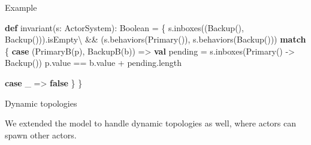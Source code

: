 \documentclass[ignorenonframetext,]{beamer}
\newenvironment{Shaded}{}{}
\newcommand{\FunctionTok}[1]{\textcolor[rgb]{0.02,0.16,0.49}{#1}}
\newcommand{\KeywordTok}[1]{\textcolor[rgb]{0.00,0.44,0.13}{\textbf{#1}}}
\newcommand{\NormalTok}[1]{#1}
\begin{document}
\begin{frame}[fragile]{%
\protect\hypertarget{example-4}{%
Example}}

\begin{Shaded}
\begin{Highlighting}[]
\KeywordTok{def} \FunctionTok{invariant}\NormalTok{(s: ActorSystem): Boolean = \{}
\NormalTok{  s.}\FunctionTok{inboxes}\NormalTok{((}\FunctionTok{Backup}\NormalTok{(), }\FunctionTok{Backup}\NormalTok{())).}\FunctionTok{isEmpty}\NormalTok{\textbackslash{}}
\NormalTok{  &&}
\NormalTok{  (s.}\FunctionTok{behaviors}\NormalTok{(}\FunctionTok{Primary}\NormalTok{()), s.}\FunctionTok{behaviors}\NormalTok{(}\FunctionTok{Backup}\NormalTok{())) }\KeywordTok{match}\NormalTok{ \{}
    \KeywordTok{case}\NormalTok{ (}\FunctionTok{PrimaryB}\NormalTok{(p), }\FunctionTok{BackupB}\NormalTok{(b)) =>}
      \KeywordTok{val}\NormalTok{ pending = s.}\FunctionTok{inboxes}\NormalTok{(}\FunctionTok{Primary}\NormalTok{() -> }\FunctionTok{Backup}\NormalTok{())}
\NormalTok{      p.}\FunctionTok{value}\NormalTok{ == b.}\FunctionTok{value}\NormalTok{ + pending.}\FunctionTok{length}

    \KeywordTok{case}\NormalTok{ _ => }\KeywordTok{false}
\NormalTok{  \}}
\NormalTok{\}}
\end{Highlighting}
\end{Shaded}

\end{frame}

\begin{frame}{%
\protect\hypertarget{dynamic-topologies}{%
Dynamic topologies}}

We extended the model to handle dynamic topologies as well, where actors
can spawn other actors.

\end{frame}
\end{document}
